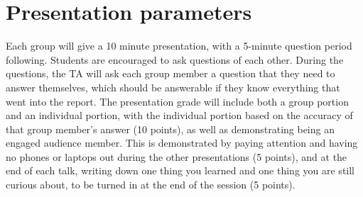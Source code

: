 \section{Presentation parameters}

Each group will give a 10 minute presentation, with a 5-minute question period following. Students are encouraged to ask questions of each other. During the questions, the TA will ask each group member a question that they need to answer themselves, which should be answerable if they know everything that went into the report. The presentation grade will include both a group portion and an individual portion, with the individual portion based on the accuracy of that group member's answer (10 points), as well as demonstrating being an engaged audience member. This is demonstrated by paying attention and having no phones or laptops out during the other presentations (5 points), and at the end of each talk, writing down one thing you learned and one thing you are still curious about, to be turned in at the end of the session (5 points).

